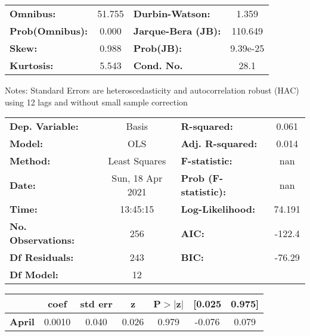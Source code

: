 \begin{center}
\begin{tabular}{lcccccc}
\bottomrule
\end{tabular}
\begin{tabular}{lclc}
\textbf{Omnibus:}       & 51.755 & \textbf{  Durbin-Watson:     } &    1.359  \\
\textbf{Prob(Omnibus):} &  0.000 & \textbf{  Jarque-Bera (JB):  } &  110.649  \\
\textbf{Skew:}          &  0.988 & \textbf{  Prob(JB):          } & 9.39e-25  \\
\textbf{Kurtosis:}      &  5.543 & \textbf{  Cond. No.          } &     28.1  \\
\bottomrule
\end{tabular}
\end{center}

Notes: \newline
 [1] Standard Errors are heteroscedasticity and autocorrelation robust (HAC) using 12 lags and without small sample correction\begin{center}
\begin{tabular}{lclc}
\toprule
\textbf{Dep. Variable:}    &      Basis       & \textbf{  R-squared:         } &     0.061   \\
\textbf{Model:}            &       OLS        & \textbf{  Adj. R-squared:    } &     0.014   \\
\textbf{Method:}           &  Least Squares   & \textbf{  F-statistic:       } &       nan   \\
\textbf{Date:}             & Sun, 18 Apr 2021 & \textbf{  Prob (F-statistic):} &      nan    \\
\textbf{Time:}             &     13:45:15     & \textbf{  Log-Likelihood:    } &    74.191   \\
\textbf{No. Observations:} &         256      & \textbf{  AIC:               } &    -122.4   \\
\textbf{Df Residuals:}     &         243      & \textbf{  BIC:               } &    -76.29   \\
\textbf{Df Model:}         &          12      & \textbf{                     } &             \\
\bottomrule
\end{tabular}
\begin{tabular}{lcccccc}
                   & \textbf{coef} & \textbf{std err} & \textbf{z} & \textbf{P$> |$z$|$} & \textbf{[0.025} & \textbf{0.975]}  \\
\midrule
\textbf{April}     &       0.0010  &        0.040     &     0.026  &         0.979        &       -0.076    &        0.079     \\

\end{tabular}
\end{center}
